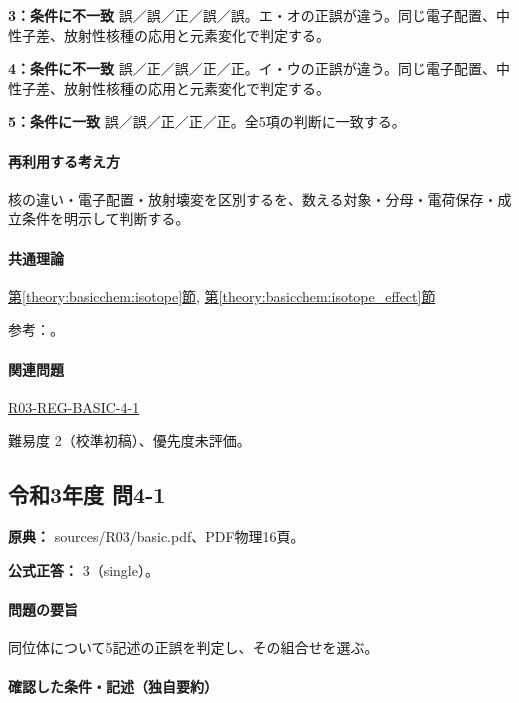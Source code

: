 \noindent\textbf{3：条件に不一致} 誤／誤／正／誤／誤。エ・オの正誤が違う。同じ電子配置、中性子差、放射性核種の応用と元素変化で判定する。\par

\noindent\textbf{4：条件に不一致} 誤／正／誤／正／正。イ・ウの正誤が違う。同じ電子配置、中性子差、放射性核種の応用と元素変化で判定する。\par

\noindent\textbf{5：条件に一致} 誤／誤／正／正／正。全5項の判断に一致する。\par

\paragraph{再利用する考え方} 核の違い・電子配置・放射壊変を区別するを、数える対象・分母・電荷保存・成立条件を明示して判断する。

\paragraph{共通理論} \hyperref[theory:basicchem:isotope]{第\ref*{theory:basicchem:isotope}節}, \hyperref[theory:basicchem:isotope_effect]{第\ref*{theory:basicchem:isotope_effect}節}

\par 参考：\cite{iupac_isotopes,iupac_isotope_effect}。

\paragraph{関連問題} \hyperref[q:r03-reg-basic-4-1]{R03-REG-BASIC-4-1}

\par 難易度 2（校準初稿）、優先度未評価。

\subsection{令和3年度 問4-1}
\label{q:r03-reg-basic-4-1}

\noindent\textbf{原典：} sources/R03/basic.pdf、PDF物理16頁。

\textbf{公式正答：} 3（single）。

\paragraph{問題の要旨} 同位体について5記述の正誤を判定し、その組合せを選ぶ。

\paragraph{確認した条件・記述（独自要約）}\mbox{}\par

